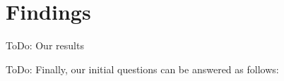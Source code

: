 \section{Findings} %
\label{sec:findings}

\colorbox{yellow!30}{ToDo:} Our results

\colorbox{yellow!30}{ToDo:} Finally, our initial questions can be answered as follows:
